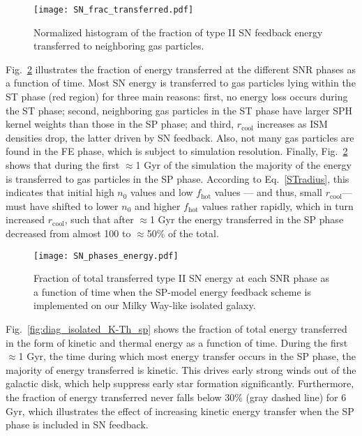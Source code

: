\documentclass[iop]{emulateapj}
\begin{document}
\begin{figure}
\texttt{[image: SN\_frac\_transferred.pdf]}
\caption{Normalized histogram of the fraction of type II SN feedback energy transferred to neighboring gas particles.}
\label{fig:diag_isolated_Etransferred}
\end{figure}

Fig.~\ref{fig:diag_isolated_PhasesE} illustrates the fraction of energy transferred at the different SNR phases as a function of time. Most SN energy is transferred to gas particles lying within the ST phase (red region) for three main reasons: first, no energy loss occurs during the ST phase; second, neighboring gas particles in the ST phase have larger SPH kernel weights than those in the SP phase; and third, $r_{\mathrm{cool}}$ increases as ISM densities drop, the latter driven by SN feedback. Also, not many gas particles are found in the FE phase, which is subject to simulation resolution. Finally, Fig.~\ref{fig:diag_isolated_PhasesE} shows that during the first $\approx$1 Gyr of the simulation the majority of the energy is transferred to gas particles in the SP phase. According to Eq.~\ref{STradius}, this indicates that initial high $n_0$ values and low $f_{\mathrm{hot}}$ values --- and thus, small $r_{\mathrm{cool}}$--- must have shifted to lower $n_0$ and higher $f_{\mathrm{hot}}$ values rather rapidly, which in turn increased $r_{\mathrm{cool}}$, such that after $\approx$1 Gyr the energy transferred in the SP phase decreased from almost 100 to $\approx$50\% of the total.

\begin{figure}
\texttt{[image: SN\_phases\_energy.pdf]}
\caption{Fraction of total transferred type II SN energy at each SNR phase as a function of time when the SP-model energy feedback scheme is implemented on our Milky Way-like isolated galaxy.}
\label{fig:diag_isolated_PhasesE}
\end{figure}

Fig.~\ref{fig:diag_isolated_K-Th_sp} shows the fraction of total energy transferred in the form of kinetic and thermal energy as a function of time. During the first $\approx$1 Gyr, the time during which most energy transfer occurs in the SP phase, the majority of energy transferred is kinetic. This drives early strong winds out of the galactic disk, which help suppress early star formation significantly. Furthermore, the fraction of energy transferred never falls below 30\% (gray dashed line) for 6 Gyr, which illustrates the effect of increasing kinetic energy transfer when the SP phase is included in SN feedback. 
\end{document}
